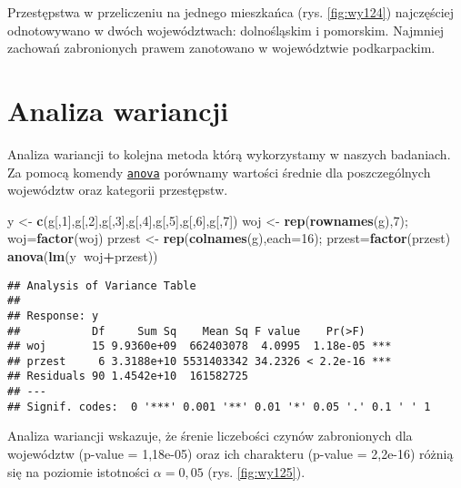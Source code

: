 \documentclass[polish,]{book}
\newenvironment{Shaded}{\begin{snugshade}}{\end{snugshade}}
\newcommand{\DataTypeTok}[1]{\textcolor[rgb]{0.13,0.29,0.53}{#1}}
\newcommand{\DecValTok}[1]{\textcolor[rgb]{0.00,0.00,0.81}{#1}}
\newcommand{\KeywordTok}[1]{\textcolor[rgb]{0.13,0.29,0.53}{\textbf{#1}}}
\newcommand{\NormalTok}[1]{#1}
\newcommand{\OperatorTok}[1]{\textcolor[rgb]{0.81,0.36,0.00}{\textbf{#1}}}
\newcommand{\StringTok}[1]{\textcolor[rgb]{0.31,0.60,0.02}{#1}}
\begin{document}
Przestępstwa w przeliczeniu na jednego mieszkańca (rys. \ref{fig:wy124}) najczęściej odnotowywano w dwóch województwach: dolnośląskim i pomorskim. Najmniej zachowań zabronionych prawem zanotowano w województwie podkarpackim.

\hypertarget{part_12.3}{%
\section{Analiza wariancji}\label{part_12.3}}

Analiza wariancji to kolejna metoda którą wykorzystamy w naszych badaniach.
Za pomocą komendy \href{https://rdrr.io/r/stats/anova.html}{\texttt{anova}} porównamy wartości średnie dla poszczególnych województw oraz kategorii przestępstw.

\begin{Shaded}
\begin{Highlighting}[]
\NormalTok{y <-}\StringTok{ }\KeywordTok{c}\NormalTok{(g[,}\DecValTok{1}\NormalTok{],g[,}\DecValTok{2}\NormalTok{],g[,}\DecValTok{3}\NormalTok{],g[,}\DecValTok{4}\NormalTok{],g[,}\DecValTok{5}\NormalTok{],g[,}\DecValTok{6}\NormalTok{],g[,}\DecValTok{7}\NormalTok{])}
\NormalTok{woj <-}\StringTok{ }\KeywordTok{rep}\NormalTok{(}\KeywordTok{rownames}\NormalTok{(g),}\DecValTok{7}\NormalTok{); woj=}\KeywordTok{factor}\NormalTok{(woj)}
\NormalTok{przest <-}\StringTok{ }\KeywordTok{rep}\NormalTok{(}\KeywordTok{colnames}\NormalTok{(g),}\DataTypeTok{each=}\DecValTok{16}\NormalTok{); przest=}\KeywordTok{factor}\NormalTok{(przest)}
\KeywordTok{anova}\NormalTok{(}\KeywordTok{lm}\NormalTok{(y}\OperatorTok{~}\NormalTok{woj}\OperatorTok{+}\NormalTok{przest))}
\end{Highlighting}
\end{Shaded}

\begin{verbatim}
## Analysis of Variance Table
## 
## Response: y
##           Df     Sum Sq    Mean Sq F value    Pr(>F)    
## woj       15 9.9360e+09  662403078  4.0995  1.18e-05 ***
## przest     6 3.3188e+10 5531403342 34.2326 < 2.2e-16 ***
## Residuals 90 1.4542e+10  161582725                      
## ---
## Signif. codes:  0 '***' 0.001 '**' 0.01 '*' 0.05 '.' 0.1 ' ' 1
\end{verbatim}

Analiza wariancji wskazuje, że śrenie liczebości czynów zabronionych dla województw (p-value = 1,18e-05) oraz ich charakteru (p-value = 2,2e-16) różnią się na poziomie istotności \(\alpha = 0,05\) (rys. \ref{fig:wy125}).
\end{document}
